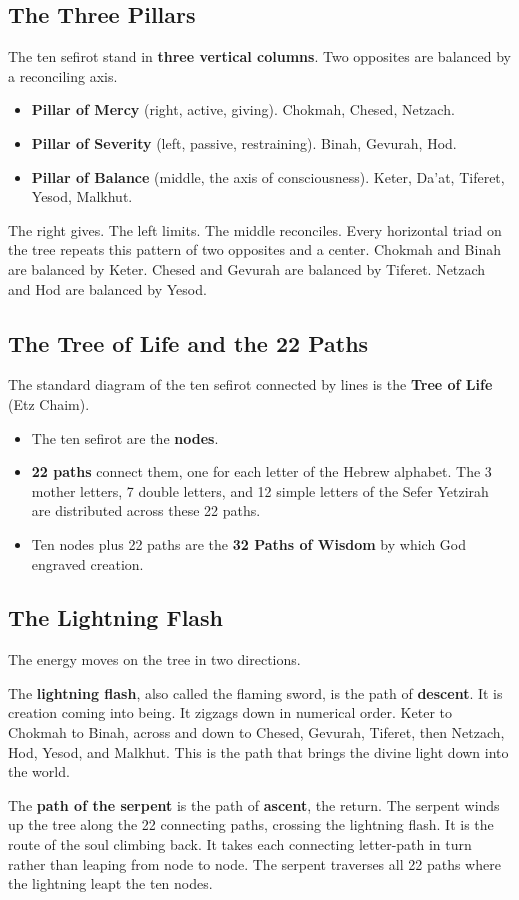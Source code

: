 \subsection{The Three Pillars}

The ten sefirot stand in \textbf{three vertical columns}. Two opposites are balanced by a reconciling
axis.

\begin{itemize}
 \item \textbf{Pillar of Mercy} (right, active, giving). Chokmah, Chesed, Netzach.
 \item \textbf{Pillar of Severity} (left, passive, restraining). Binah, Gevurah, Hod.
 \item \textbf{Pillar of Balance} (middle, the axis of consciousness). Keter, Da'at, Tiferet, Yesod,
 Malkhut.
\end{itemize}

The right gives. The left limits. The middle reconciles. Every horizontal triad on the tree repeats
this pattern of two opposites and a center. Chokmah and Binah are balanced by Keter. Chesed and Gevurah
are balanced by Tiferet. Netzach and Hod are balanced by Yesod.

\subsection{The Tree of Life and the 22 Paths}

The standard diagram of the ten sefirot connected by lines is the \textbf{Tree of Life} (Etz Chaim).

\begin{itemize}
 \item The ten sefirot are the \textbf{nodes}.
 \item \textbf{22 paths} connect them, one for each letter of the Hebrew alphabet. The 3 mother
 letters, 7 double letters, and 12 simple letters of the Sefer Yetzirah are distributed across these
 22 paths.
 \item Ten nodes plus 22 paths are the \textbf{32 Paths of Wisdom} by which God engraved creation.
\end{itemize}

\subsection{The Lightning Flash}

The energy moves on the tree in two directions.

The \textbf{lightning flash}, also called the flaming sword, is the path of \textbf{descent}. It is
creation coming into being. It zigzags down in numerical order. Keter to Chokmah to Binah, across and
down to Chesed, Gevurah, Tiferet, then Netzach, Hod, Yesod, and Malkhut. This is the path that brings
the divine light down into the world.

The \textbf{path of the serpent} is the path of \textbf{ascent}, the return. The serpent winds up the
tree along the 22 connecting paths, crossing the lightning flash. It is the route of the soul climbing
back. It takes each connecting letter-path in turn rather than leaping from node to node. The serpent
traverses all 22 paths where the lightning leapt the ten nodes.
